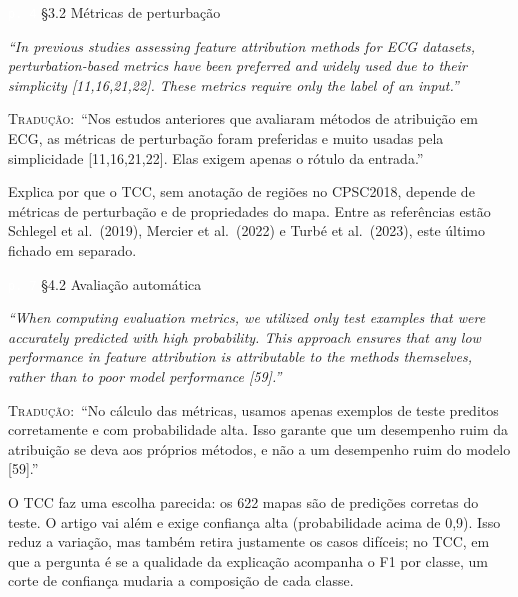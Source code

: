 \documentclass[11pt,a4paper]{article}
\newcommand{\pagechip}[1]{{\setlength{\fboxsep}{1.5pt}\colorbox{cAcc}{\textcolor{white}{\scriptsize\texttt{#1}}}}}
\newenvironment{origquote}{\par\itshape\small}{\par}
\newenvironment{tradquote}{\par\small\textsc{Tradução:}\ }{\par}
\newcommand{\explab}[1]{\par\smallskip{\small\color{cAcc}\textbf{\MakeUppercase{#1}}}\par}
\begin{document}
\begin{citacard}{\pagechip{p. 4} §3.2 Métricas de perturbação}
\begin{origquote}“In previous studies assessing feature attribution methods for ECG datasets, perturbation-based metrics have been preferred and widely used due to their simplicity [11,16,21,22]. These metrics require only the label of an input.”\end{origquote}
\begin{tradquote}“Nos estudos anteriores que avaliaram métodos de atribuição em ECG, as métricas de perturbação foram preferidas e muito usadas pela simplicidade [11,16,21,22]. Elas exigem apenas o rótulo da entrada.”\end{tradquote}
\explab{Explicação}
Explica por que o TCC, sem anotação de regiões no CPSC2018, depende de métricas de perturbação e de propriedades do mapa. Entre as referências estão Schlegel et al.\ (2019), Mercier et al.\ (2022) e Turbé et al.\ (2023), este último fichado em separado.
\end{citacard}

\begin{citacard}{\pagechip{p. 7} §4.2 Avaliação automática}
\begin{origquote}“When computing evaluation metrics, we utilized only test examples that were accurately predicted with high probability. This approach ensures that any low performance in feature attribution is attributable to the methods themselves, rather than to poor model performance [59].”\end{origquote}
\begin{tradquote}“No cálculo das métricas, usamos apenas exemplos de teste preditos corretamente e com probabilidade alta. Isso garante que um desempenho ruim da atribuição se deva aos próprios métodos, e não a um desempenho ruim do modelo [59].”\end{tradquote}
\explab{Explicação}
O TCC faz uma escolha parecida: os 622 mapas são de predições corretas do teste. O artigo vai além e exige confiança alta (probabilidade acima de 0,9). Isso reduz a variação, mas também retira justamente os casos difíceis; no TCC, em que a pergunta é se a qualidade da explicação acompanha o F1 por classe, um corte de confiança mudaria a composição de cada classe.
\end{citacard}
\end{document}
